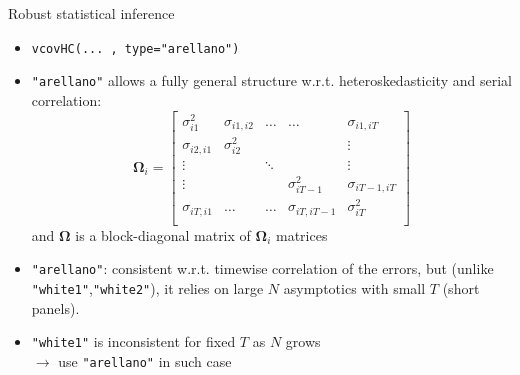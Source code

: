 \documentclass{beamer}
\begin{document}
\begin{frame}{Robust statistical inference}
\begin{itemize}
    \item \texttt{vcovHC(... , type="arellano")}
    \medskip
    \item \texttt{"arellano"} allows a fully general structure w.r.t. heteroskedasticity and serial correlation:
    $$
    \bm{\Omega}_i = 
    \begin{bmatrix}
    \sigma_{i1}^2 & \sigma_{i1,i2} & \dots & \dots & \sigma_{i1,iT} \\
    \sigma_{i2,i1} & \sigma_{i2}^2 &       &       & \vdots \\
    \vdots         &               & \ddots &      & \vdots \\
   \vdots         &               &  &  \sigma_{iT-1}^2    & \sigma_{iT-1,iT} \\
   \sigma_{iT,i1}       &   \dots & \dots    &  \sigma_{iT,iT-1}    & \sigma_{iT}^2 \\
    \end{bmatrix}
    $$
    and $\bm{\Omega}$ is a block-diagonal matrix of $\bm{\Omega}_i$ matrices
    \smallskip
    \item \texttt{"arellano"}: consistent w.r.t. timewise correlation of the errors, but (unlike \texttt{"white1"},\texttt{"white2"}), it relies on large $N$ asymptotics with small $T$ (short panels).
    \smallskip
    \item \texttt{"white1"} is inconsistent for fixed $T$ as $N$ grows \\$\rightarrow$ use \texttt{"arellano"} in such case 
\end{itemize}
\end{frame}
\end{document}
